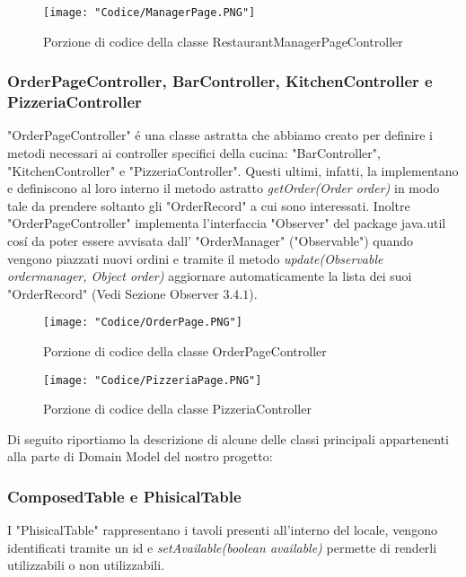 \documentclass{article}
\begin{document}
\begin{figure}[!h]
\centering
\texttt{[image: "Codice/ManagerPage.PNG"]}
\caption{Porzione di codice della classe RestaurantManagerPageController}
\end{figure}

\newpage


\subsubsection{OrderPageController, BarController, KitchenController e PizzeriaController}

"OrderPageController" \'e una classe astratta che abbiamo creato per definire i metodi necessari ai controller specifici della cucina: "BarController", "KitchenController" e "PizzeriaController". Questi ultimi, infatti, la implementano e definiscono al loro interno il metodo astratto \textit{getOrder(Order order)} in modo tale da prendere soltanto gli "OrderRecord" a cui sono interessati. Inoltre "OrderPageController" implementa l'interfaccia "Observer" del package java.util cos\'i da poter essere avvisata dall' "OrderManager" ("Observable") quando vengono piazzati nuovi ordini e tramite il metodo \textit{update(Observable ordermanager, Object order)} aggiornare automaticamente la lista dei suoi "OrderRecord" (Vedi Sezione Observer $3.4.1 $).

\begin{figure}[!h]
\centering
\texttt{[image: "Codice/OrderPage.PNG"]}
\caption{Porzione di codice della classe OrderPageController}
\end{figure}

\begin{figure}[!h]
\centering
\texttt{[image: "Codice/PizzeriaPage.PNG"]}
\caption{Porzione di codice della classe PizzeriaController}
\end{figure}

\newpage

\noindent Di seguito riportiamo la descrizione di alcune delle classi principali appartenenti alla parte di Domain Model del nostro progetto: 

\subsubsection{ComposedTable e PhisicalTable}

I "PhisicalTable" rappresentano i tavoli presenti all'interno del locale, vengono identificati tramite un id e \textit{setAvailable(boolean available)} permette di renderli utilizzabili o non utilizzabili.
\end{document}
